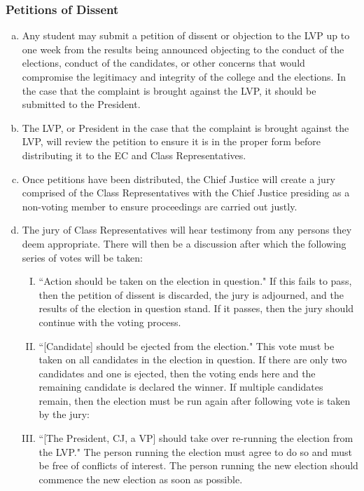 \documentclass[USletter,12pt]{article}
\begin{document}
\subsubsection{Petitions of Dissent}
\begin{enumerate}[(a)]
\item Any student may submit a petition of dissent or objection to the LVP up to one week from the results being announced objecting to the conduct of the elections, conduct of the candidates, or other concerns that would compromise the legitimacy and integrity of the college and the elections.  In the case that the complaint is brought against the LVP, it should be submitted to the President.  
\item The LVP, or President in the case that the complaint is brought against the LVP, will review the petition to ensure it is in the proper form before distributing it to the EC and Class Representatives.
\item Once petitions have been distributed, the Chief Justice will create a jury comprised of the Class Representatives with the Chief Justice presiding as a non-voting member to ensure proceedings are carried out justly.
\item The jury of Class Representatives will hear testimony from any persons they deem appropriate.  There will then be a discussion after which the following series of votes will be taken:
	\begin{enumerate}[(I)]
	\item ``Action should be taken on the election in question."  If this fails to pass, then the petition of dissent is discarded, the jury is adjourned, and the results of the election in question stand.  If it passes, then the jury should continue with the voting process.
	\item ``[Candidate] should be ejected from the election."  This vote must be taken on all candidates in the election in question.  If there are only two candidates and one is ejected, then the voting ends here and the remaining candidate is declared the winner.  If multiple candidates remain, then the election must be run again after following vote is taken by the jury:
	\item ``[The President, CJ, a VP] should take over re-running the election from the LVP."  The person running the election must agree to do so and must be free of conflicts of interest.  The person running the new election should commence the new election as soon as possible.
	\end{enumerate}
\end{enumerate}
\end{document}
